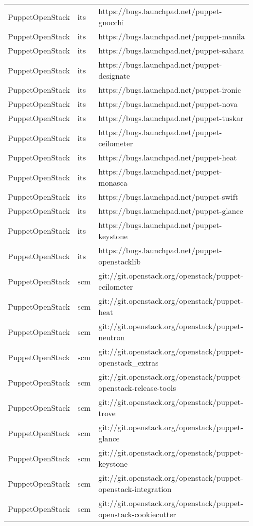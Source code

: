 \begin{center}
\begin{longtable}{|p{4cm}|p{1cm}|p{10cm}|}
PuppetOpenStack&its&https://bugs.launchpad.net/puppet-gnocchi\\ 
PuppetOpenStack&its&https://bugs.launchpad.net/puppet-manila\\ 
PuppetOpenStack&its&https://bugs.launchpad.net/puppet-sahara\\ 
PuppetOpenStack&its&https://bugs.launchpad.net/puppet-designate\\ 
PuppetOpenStack&its&https://bugs.launchpad.net/puppet-ironic\\ 
PuppetOpenStack&its&https://bugs.launchpad.net/puppet-nova\\ 
PuppetOpenStack&its&https://bugs.launchpad.net/puppet-tuskar\\ 
PuppetOpenStack&its&https://bugs.launchpad.net/puppet-ceilometer\\ 
PuppetOpenStack&its&https://bugs.launchpad.net/puppet-heat\\ 
PuppetOpenStack&its&https://bugs.launchpad.net/puppet-monasca\\ 
PuppetOpenStack&its&https://bugs.launchpad.net/puppet-swift\\ 
PuppetOpenStack&its&https://bugs.launchpad.net/puppet-glance\\ 
PuppetOpenStack&its&https://bugs.launchpad.net/puppet-keystone\\ 
PuppetOpenStack&its&https://bugs.launchpad.net/puppet-openstacklib\\ 
PuppetOpenStack&scm&git://git.openstack.org/openstack/puppet-ceilometer\\ 
PuppetOpenStack&scm&git://git.openstack.org/openstack/puppet-heat\\ 
PuppetOpenStack&scm&git://git.openstack.org/openstack/puppet-neutron\\ 
PuppetOpenStack&scm&git://git.openstack.org/openstack/puppet-openstack\_extras\\ 
PuppetOpenStack&scm&git://git.openstack.org/openstack/puppet-openstack-release-tools\\ 
PuppetOpenStack&scm&git://git.openstack.org/openstack/puppet-trove\\ 
PuppetOpenStack&scm&git://git.openstack.org/openstack/puppet-glance\\ 
PuppetOpenStack&scm&git://git.openstack.org/openstack/puppet-keystone\\ 
PuppetOpenStack&scm&git://git.openstack.org/openstack/puppet-openstack-integration\\ 
PuppetOpenStack&scm&git://git.openstack.org/openstack/puppet-openstack-cookiecutter\\ 

\end{longtable}
\end{center}
